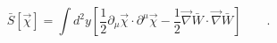 \begin{equation}
\bar{S}[\vec{\chi}]= \int d^2 y \left[ \frac{1}{2}
\partial_\mu\vec{\chi} \cdot
\partial^\mu \vec{\chi}- \frac{1}{2} \vec{\nabla}\bar{W}
\cdot \vec{\nabla}\bar{W} \right]\qquad .
 \label{eq:action}
\end{equation}

